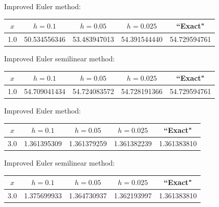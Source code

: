 \bigskip

{\small Improved Euler method:
\begin{tabular}{|c|r|r|r|r|}
\hline
\multicolumn{1}{|c|}{$x$}&
\multicolumn{1}{|c|}{$h=0.1$}&
\multicolumn{1}{|c|}{$h=0.05$}&
\multicolumn{1}{|c|}{$h=0.025$}&
\multicolumn{1}{|c|}{``Exact"}\\ \hline
1.0 & 50.534556346 & 53.483947013 & 54.391544440 & 54.729594761 \\
\hline
\end{tabular}}
\medskip

\bigskip

\hspace{.75in}
{\small Improved Euler semilinear method:
\begin{tabular}{|c|r|r|r|r|}
\hline
\multicolumn{1}{|c|}{$x$}&
\multicolumn{1}{|c|}{$h=0.1$}&
\multicolumn{1}{|c|}{$h=0.05$}&
\multicolumn{1}{|c|}{$h=0.025$}&
\multicolumn{1}{|c|}{``Exact"}\\ \hline
1.0 & 54.709041434 & 54.724083572 & 54.728191366 & 54.729594761 \\
\hline
\end{tabular}}

\bigskip

{\small Improved Euler method:
\begin{tabular}{|c|r|r|r|r|}
\hline
\multicolumn{1}{|c|}{$x$}&
\multicolumn{1}{|c|}{$h=0.1$}&
\multicolumn{1}{|c|}{$h=0.05$}&
\multicolumn{1}{|c|}{$h=0.025$}&
\multicolumn{1}{|c|}{``Exact"}\\ \hline
3.0 & 1.361395309 & 1.361379259 & 1.361382239 & 1.361383810 \\
\hline
\end{tabular}}
\medskip

\bigskip

\hspace{.75in}
{\small Improved Euler semilinear method:
\begin{tabular}{|c|r|r|r|r|}
\hline
\multicolumn{1}{|c|}{$x$}&
\multicolumn{1}{|c|}{$h=0.1$}&
\multicolumn{1}{|c|}{$h=0.05$}&
\multicolumn{1}{|c|}{$h=0.025$}&
\multicolumn{1}{|c|}{``Exact"}\\ \hline
3.0 & 1.375699933 & 1.364730937 & 1.362193997 & 1.361383810 \\
\hline
\end{tabular}}

\bigskip

